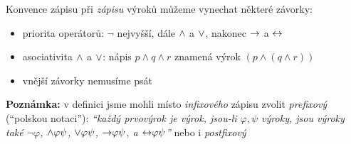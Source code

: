 \documentclass{beamer}
\begin{document}
\begin{frame}{Konvence zápisu}
    při \emph{zápisu} výroků můžeme vynechat některé závorky:
    \vspace{-12pt}
    \begin{itemize}
        \item priorita operátorů: $\neg$ nejvyšší, dále ${\land}$ a ${\lor}$, nakonec ${\mathbin{\rightarrow}}$ a ${\mathbin{\leftrightarrow}}$
        \item asociativita ${\land}$ a ${\lor}$: nápis $p\land q\land r$ znamená výrok $(p\land (q\land r))$
        \item vnější závorky nemusíme psát
    \end{itemize}

    \textbf{Poznámka:} v definici jsme mohli místo \emph{infixového} zápisu zvolit \emph{prefixový} (``polskou notaci''):
    {\it ``každý prvovýrok je výrok, jsou-li $\varphi,\psi$ výroky, jsou výroky také $\neg \varphi$, ${\land} \varphi \psi$, ${\lor} \varphi \psi$, ${\mathbin{\rightarrow}} \varphi \psi$, a ${\mathbin{\leftrightarrow}} \varphi \psi$''} nebo i \emph{postfixový}
    


\end{frame}
\end{document}
